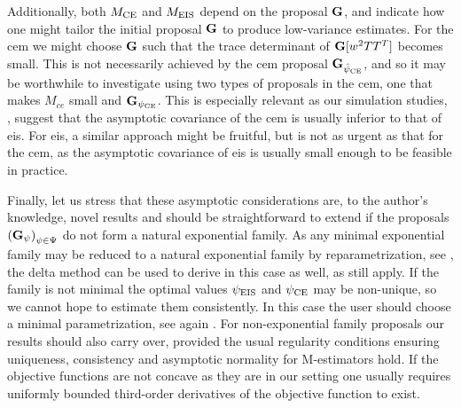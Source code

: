 Additionally, both $M_{{\text{CE}}}$ and $M_{{\text{EIS}}}$ depend on the proposal $\mathbf G$, and indicate how one might tailor the initial proposal $\mathbf G$ to produce low-variance estimates. For the \acrshort{cem} we might choose $\mathbf G$ such that the trace determinant of $\mathbf G [w^{2} TT^{T}]$ becomes small. This is not necessarily achieved by the \acrshort{cem} proposal $\mathbf G_{{\hat\psi_{\text{CE}}}}$, and so it may be worthwhile to investigate using two types of proposals in the \acrshort{cem}, one that makes $M_{ce}$ small and $\mathbf G_{{\psi_{\text{CE}}}}$. This is especially relevant as our simulation studies, , suggest that the asymptotic covariance of the \acrshort{cem} is usually inferior to that of \acrshort{eis}. For \acrshort{eis}, a similar approach might be fruitful, but is not as urgent as that for the \acrshort{cem}, as the asymptotic covariance of \acrshort{eis} is usually small enough to be feasible in practice.

Finally, let us stress that these asymptotic considerations are, to the author's knowledge, novel results and should be straightforward to extend if the proposals $\left(\mathbf G_{\psi}\right)_{\psi \in \Psi}$ do not form a natural exponential family. As any minimal exponential family may be reduced to a natural exponential family by reparametrization, see \citep[Theorem 1.9]{Brown1986Fundamentals}, the delta method can be used to derive  in this case as well, as  still apply. If the family is not minimal the optimal values ${\psi_{\text{EIS}}}$ and ${\psi_{\text{CE}}}$ may be non-unique, so we cannot hope to estimate them consistently. In this case the user should choose a minimal parametrization, see again \citep[Theorem 1.9]{Brown1986Fundamentals}. 
For non-exponential family proposals our results should also carry over, provided the usual regularity conditions ensuring uniqueness, consistency and asymptotic normality for M-estimators hold. If the objective functions are not concave as they are in our setting one usually requires uniformly bounded third-order derivatives of the objective function to exist. 


